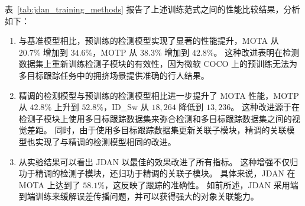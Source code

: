 表~\ref{tab:jdan_training_methods} 报告了上述训练范式之间的性能比较结果，分析如下：
\begin{enumerate} 
	\item 与{基准模型}相比，{预训练的检测模型}实现了显著的性能提升，MOTA 从 $20.7\%$ 增加到 $34.6\%$，MOTP 从 $38.3\%$ 增加到 $42.8\%$。
	这种改进表明在检测数据集上重新训练{检测子模块}的有效性，因为微软 COCO 上的预训练无法为多目标跟踪任务中的拥挤场景提供准确的行人结果。
	
	\item {精调的检测模型}与{预训练的检测模型}相比进一步提升了 MOTA 性能，MOTP 从 $42.8\%$ 上升到 $52.8\%$，ID\_Sw 从 $18,264$ 降低到 $13,236$。
	这种改进源于在{检测子模块}上使用多目标跟踪数据集来弥合检测和多目标跟踪数据集之间的视觉差距。
	同时，由于使用多目标跟踪数据集更新{关联子模块}，{精调的关联模型}也实现了与{精调的检测模型}相同的改进。
	
	\item 从实验结果可以看出 JDAN 以最佳的效果改进了所有指标。
	这种增强不仅归功于精调的{检测子模块}，还归功于精调的{关联子模块}。
	具体来说，JDAN 在 MOTA 上达到了 $58.1\%$，这反映了跟踪的准确性。
	如前所述，JDAN 采用{端到端}训练来缓解误差传播问题，并可以获得强大的对象关联能力。
\end{enumerate}

% 
%
%


